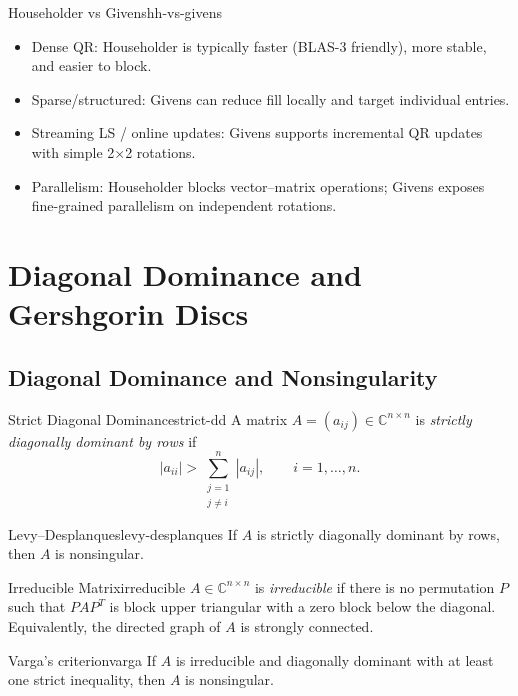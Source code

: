 \begin{remark}{Householder vs Givens}{hh-vs-givens}
    \begin{itemize}
        \item Dense QR: Householder is typically faster (BLAS-3 friendly), more stable, and easier to block.
        \item Sparse/structured: Givens can reduce fill locally and target individual entries.
        \item Streaming LS / online updates: Givens supports incremental QR updates with simple 2×2 rotations.
        \item Parallelism: Householder blocks vector–matrix operations; Givens exposes fine-grained parallelism on independent rotations.
    \end{itemize}
\end{remark}

\section{Diagonal Dominance and Gershgorin Discs}
\label{sec:gershgorin}

\subsection{Diagonal Dominance and Nonsingularity}
\begin{definition}{Strict Diagonal Dominance}{strict-dd}
    A matrix $A=(a_{ij})\in\mathbb{C}^{n\times n}$ is \emph{strictly diagonally dominant by rows} if
    \[
        |a_{ii}| > \sum_{\substack{j=1\\ j\ne i}}^n |a_{ij}|,\qquad i=1,\dots,n.
    \]
\end{definition}

\begin{theorem}{Levy--Desplanques}{levy-desplanques}
    If $A$ is strictly diagonally dominant by rows, then $A$ is nonsingular.
\end{theorem}

\begin{definition}{Irreducible Matrix}{irreducible}
    $A\in\mathbb{C}^{n\times n}$ is \emph{irreducible} if there is no permutation $P$ such that $PAP^T$ is block upper triangular with a zero block below the diagonal. Equivalently, the directed graph of $A$ is strongly connected.
\end{definition}

\begin{theorem}{Varga's criterion}{varga}
    If $A$ is irreducible and diagonally dominant with at least one strict inequality, then $A$ is nonsingular.
\end{theorem}

